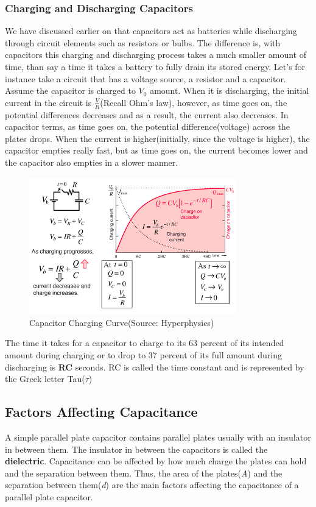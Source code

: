 \documentclass[9pt,addpoints]{exam}
\begin{document}
	\subsubsection*{Charging and Discharging Capacitors}
	We have discussed earlier on that capacitors act as batteries while discharging through circuit elements such as resistors or bulbs. The difference is, with capacitors this charging and discharging process takes a much smaller amount of time, than say a time it takes a battery to fully drain its stored energy. Let's for instance take a circuit that has a voltage source, a resistor and a capacitor. Assume the capacitor is charged to $V_0$ amount. When it is discharging, the initial current in the circuit is $\frac{V}{R}$(Recall Ohm's law), however, as time goes on, the potential differences decreases and as a result, the current also decreases. In capacitor terms, as time goes on, the potential difference(voltage) across the plates drops. When the current is higher(initially, since the voltage is higher), the capacitor empties really fast, but as time goes on, the current becomes lower and the capacitor also empties in a slower manner. \newline
	\begin{figure}[htp]
		\centering
		\includegraphics[width=9cm]{curve.png}
		\caption{Capacitor Charging Curve(Source: Hyperphysics)}
		\label{fig:charge}
	\end{figure} \newline \newline
	The time it takes for a capacitor to charge to its 63 percent of its intended amount during charging or to drop to 37 percent of its full amount during discharging is \textbf{RC} seconds. RC is called the time constant and is represented by the Greek letter Tau($\tau$)
	
	\subsection*{Factors Affecting Capacitance}
	A simple parallel plate capacitor contains parallel plates usually with an insulator in between them. The insulator in between the capacitors is called the \textbf{dielectric}. Capacitance can be affected by how much charge the plates can hold and the separation between them. Thus, the area of the plates(\textit{A}) and the separation between them(\textit{d}) are the main factors affecting the capacitance of a parallel plate capacitor.
	
\end{document}
